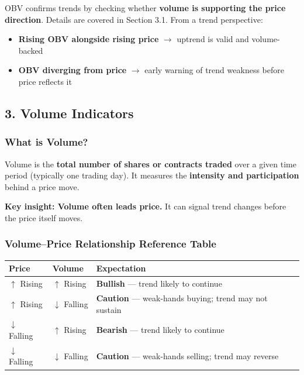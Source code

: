 \documentclass[12pt,openany]{book}
\begin{document}
OBV confirms trends by checking whether \textbf{volume is supporting the price direction}. Details are covered in Section 3.1. From a trend perspective:
\begin{itemize}[leftmargin=*]
    \item \textbf{Rising OBV alongside rising price} \(\rightarrow\) uptrend is valid and volume-backed
    \item \textbf{OBV diverging from price} \(\rightarrow\) early warning of trend weakness before price reflects it
\end{itemize}

\subsection{3. Volume Indicators}

\subsubsection{What is Volume?}

Volume is the \textbf{total number of shares or contracts traded} over a given time period (typically one trading day). It measures the \textbf{intensity and participation} behind a price move.

\textbf{Key insight: Volume often leads price.} It can signal trend changes before the price itself moves.

\subsubsection{Volume--Price Relationship Reference Table}

\begin{center}
\small
\renewcommand{\arraystretch}{1.2}
\begin{tabular}{|L{0.25\textwidth}|L{0.34\textwidth}|L{0.31\textwidth}|}
\hline
 \textbf{Price} & \textbf{Volume} & \textbf{Expectation} \\ \hline
 \(\uparrow\) Rising & \(\uparrow\) Rising & \textbf{Bullish} --- trend likely to continue \\ \hline
 \(\uparrow\) Rising & \(\downarrow\) Falling & \textbf{Caution} --- weak-hands buying; trend may not sustain \\ \hline
 \(\downarrow\) Falling & \(\uparrow\) Rising & \textbf{Bearish} --- trend likely to continue \\ \hline
 \(\downarrow\) Falling & \(\downarrow\) Falling & \textbf{Caution} --- weak-hands selling; trend may reverse \\ \hline
\end{tabular}
\end{center}
\end{document}
